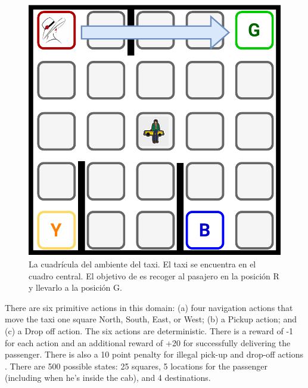 \begin{figure}[H]
    \centering
    \includegraphics[scale=0.25]{Chapter5/Figs/taxi-env.pdf}
    \caption{La cuadrícula del ambiente del taxi. El taxi se encuentra en el cuadro central. El objetivo de es recoger al
    pasajero en la posición R y llevarlo a la posición G.}
    \label{fig:taxi}
\end{figure}

There are six primitive actions in this domain: (a) four navigation actions that move the taxi one square North, South, East, or West; (b) a Pickup action; and (c) a Drop off action. The six actions are deterministic.
There is a reward of -1 for each action and an additional reward of +20 for successfully
delivering the passenger. There is also a 10 point penalty for illegal pick-up and drop-off actions \cite{Dietterich:2000:HRL:1622262.1622268}.
There are 500 possible
states: 25 squares, 5 locations for the passenger (including when he's inside the cab), and 4 destinations.

